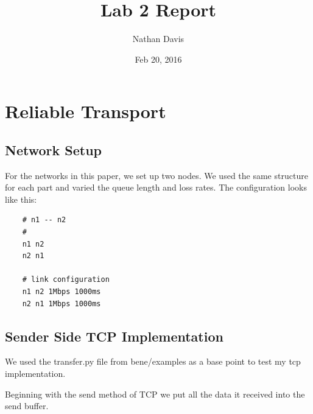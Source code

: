 \documentclass[11pt]{article}
\begin{document}
\lstset{
  language=Python,
  basicstyle=\small,          %
  keywordstyle=\bfseries,
  identifierstyle=,           %
  commentstyle=,              %
  stringstyle=\ttfamily,      %
  showstringspaces=false,     %
  numbers=left,
  numberstyle=\tiny,
  numbersep=5pt,
  frame=tb,
}

\title{Lab 2 Report}

\author{Nathan Davis}

\date{Feb 20, 2016}

\maketitle

\section{Reliable Transport}

\subsection{Network Setup}

For the networks in this paper, we set up two nodes. We used the same structure for each part and varied the queue length and loss rates. The configuration looks like this:

\vspace{5mm}

\begin{lstlisting}
    # n1 -- n2
    #
    n1 n2
    n2 n1

    # link configuration
    n1 n2 1Mbps 1000ms
    n2 n1 1Mbps 1000ms
\end{lstlisting}

\vspace{5mm}

\subsection{Sender Side TCP Implementation}

We used the transfer.py file from bene/examples as a base point to test my tcp implementation.

Beginning with the send method of TCP we put all the data it received into the send buffer.

\vspace{5mm}
\end{document}
